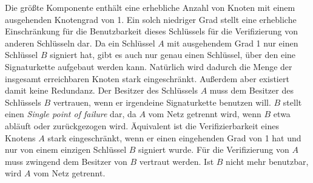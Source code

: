 Die größte Komponente enthält eine erhebliche Anzahl von Knoten
mit einem ausgehenden Knotengrad von 1. Ein solch niedriger Grad
stellt eine erhebliche Einschränkung für die Benutzbarkeit dieses
Schlüssels für die Verifizierung von anderen Schlüsseln dar. Da
ein Schlüssel $A$ mit ausgehendem Grad 1 nur einen Schlüssel $B$
signiert hat, gibt es auch nur genau einen Schlüssel, über den
eine Signaturkette aufgebaut werden kann. Natürlich wird dadurch die
Menge der insgesamt erreichbaren Knoten stark eingeschränkt. Außerdem
aber existiert damit keine Redundanz. Der Besitzer des Schlüssels
$A$ muss dem Besitzer des Schlüssels $B$ vertrauen, wenn er irgendeine 
Signaturkette benutzen will. $B$ stellt einen \emph{Single point
  of failure} dar, da $A$ vom Netz getrennt wird, wenn $B$ etwa
abläuft oder zurückgezogen wird. Äquivalent ist die
Verifizierbarkeit eines Knotens $A$ stark eingeschränkt, wenn er
einen eingehenden Grad von 1 hat und nur von einem einzigen
Schlüssel $B$ signiert wurde. Für die Verifizierung von $A$ muss
zwingend dem Besitzer von $B$ vertraut werden. Ist $B$ nicht mehr
benutzbar, wird $A$ vom Netz getrennt.

